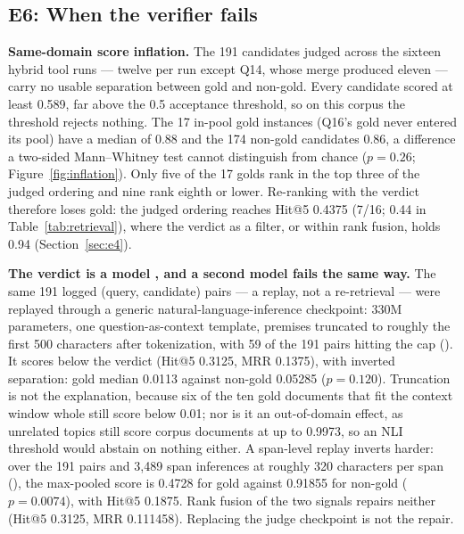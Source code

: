 \subsection{E6: When the verifier fails}
\label{sec:e6}
\label{sec:inflation}\label{sec:eval-verify}   %

\textbf{Same-domain score inflation.}
The 191 candidates judged across the sixteen hybrid tool runs --- twelve
per run except Q14, whose merge produced eleven --- carry no usable
separation between gold and non-gold. Every candidate scored at least
0.589, far above the 0.5 acceptance threshold, so on this corpus the
threshold rejects nothing. The 17 in-pool gold instances (Q16's gold never
entered its pool) have a median of 0.88 and the 174 non-gold candidates
0.86, a difference a two-sided Mann--Whitney test cannot distinguish from
chance ($p = 0.26$; Figure~\ref{fig:inflation}). Only five of the 17 golds rank in the top three of
the judged ordering and nine rank eighth or lower. Re-ranking with the
verdict therefore loses gold: the judged ordering reaches Hit@5 0.4375
(7/16; 0.44 in Table~\ref{tab:retrieval}), where the verdict as a filter,
or within rank fusion, holds 0.94 (Section~\ref{sec:e4}).

\textbf{The verdict is a model \cite{laya}, and a second model fails the
same way.}
The same 191 logged (query, candidate) pairs --- a replay, not a
re-retrieval --- were replayed through a generic natural-language-inference
checkpoint: 330M parameters, one question-as-context template, premises
truncated to roughly the first 500 characters after tokenization, with 59
of the 191 pairs hitting the cap
(). It scores
below the verdict (Hit@5
0.3125, MRR 0.1375), with inverted separation: gold median 0.0113 against
non-gold 0.05285 ($p = 0.120$). Truncation is not the explanation,
because six of the ten gold documents that fit the context window whole
still score below 0.01; nor is it an out-of-domain effect, as unrelated
topics still score corpus documents at up to 0.9973, so an NLI threshold
would abstain on nothing either. A span-level replay inverts harder: over
the 191 pairs and 3{,}489 span inferences at roughly 320 characters per
span (), the max-pooled score is 0.4728 for gold against 0.91855 for non-gold
($p = 0.0074$), with Hit@5 0.1875. Rank fusion of the two signals repairs
neither (Hit@5 0.3125, MRR 0.111458). Replacing the judge checkpoint is
not the repair.


